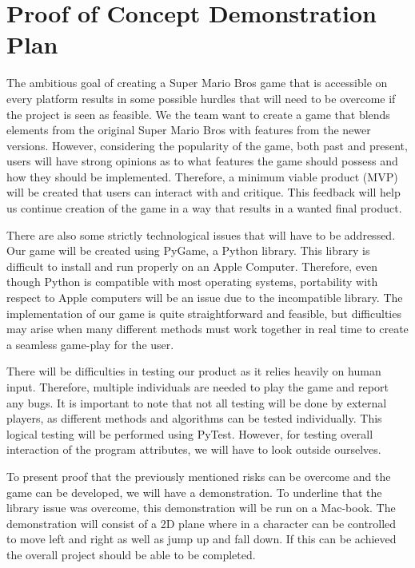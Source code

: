 \documentclass{article}
\begin{document}
\section{Proof of Concept Demonstration Plan}

The ambitious goal of creating a Super Mario Bros game that is accessible on
every platform results in some possible hurdles that will need to be overcome if
the project is seen as feasible. We the team want to create a game that blends
elements from the original Super Mario Bros with features from the newer
versions. However, considering the popularity of the game, both past and
present, users will have strong opinions as to what features the game should
possess and how they should be implemented. Therefore, a minimum viable product
(MVP) will be created that users can interact with and critique. This feedback
will help us continue creation of the game in a way that results in a wanted
final product.

There are also some strictly technological issues that will have to be
addressed. Our game will be created using PyGame, a Python library. This library
is difficult to install and run properly on an Apple Computer. Therefore, even
though Python is compatible with most operating systems, portability with
respect to Apple computers will be an issue due to the incompatible library. The
implementation of our game is quite straightforward and feasible, but
difficulties may arise when many different methods must work together in real
time to create a seamless game-play for the user.

There will be difficulties in testing our product as it relies heavily on human
input. Therefore, multiple individuals are needed to play the game and report
any bugs. It is important to note that not all testing will be done by external
players, as different methods and algorithms can be tested individually. This
logical testing will be performed using PyTest. However, for testing overall
interaction of the program attributes, we will have to look outside ourselves.

To present proof that the previously mentioned risks can be overcome and the game can
be developed, we will have a demonstration. To underline that the library issue
was overcome, this demonstration will be run on a Mac-book. The demonstration
will consist of a 2D plane where in a character can be controlled to move left
and right as well as jump up and fall down. If this can be achieved the overall
project should be able to be completed.
\end{document}
